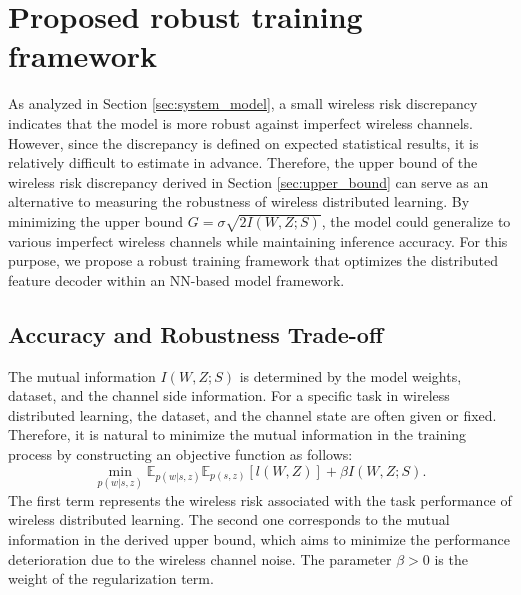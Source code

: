\documentclass[lettersize,journal]{IEEEtran}
\newcommand{\E}{\mathbb{E}}
\theoremstyle{definition}
\theoremstyle{plain}
\begin{document}
\section{Proposed robust training framework}
\label{sec:robust_training_framework}
As analyzed in Section \ref{sec:system_model}, a small wireless risk discrepancy indicates that the model is more robust against imperfect wireless channels. However, since the discrepancy is defined on expected statistical results, it is relatively difficult to estimate in advance. Therefore, the upper bound of the wireless risk discrepancy derived in Section \ref{sec:upper_bound} can serve as an alternative to measuring the robustness of wireless distributed learning. 
By minimizing the upper bound $G=\sigma\sqrt{2I(W,Z;S)}$, the model could generalize to various imperfect wireless channels while maintaining inference accuracy. 
For this purpose, we propose a robust training framework that optimizes the distributed feature decoder within an NN-based model framework.

\subsection{Accuracy and Robustness Trade-off}

The mutual information $I(W,Z;S)$ is determined by the model weights, dataset, and the channel side information. For a specific task in wireless distributed learning, the dataset, and the channel state are often given or fixed. 
Therefore, it is natural to minimize the mutual information in the training process by constructing an objective function as follows:
\begin{equation}
    \label{equ:pib_objective1}
    \min_{p(w|s,z)} \E_{p(w|s,z)} \E_{p(s,z)}\left[l(W,Z)\right] + \beta I(W,Z;S).
\end{equation}
The first term represents the wireless risk associated with the task performance of wireless distributed learning. The second one corresponds to the mutual information in the derived upper bound, which aims to minimize the performance deterioration due to the wireless channel noise.
The parameter $\beta>0$ is the weight of the regularization term.
\end{document}
